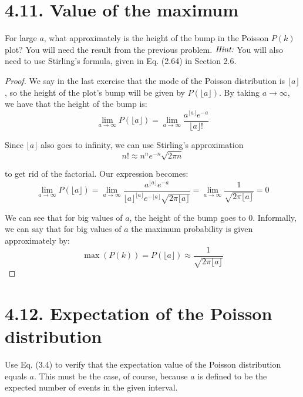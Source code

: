 \section*{4.11. Value of the maximum}
For large $a$, what approximately is the height of the bump in the Poisson $P(k)$ 
plot? You will need the result from the previous problem. $\emph{Hint:}$ You
will also need to use Stirling's formula, given in Eq. (2.64) in Section 2.6.

\vspace{1em}

\begin{proof}
    We say in the last exercise that the mode of the Poisson distribution is 
    $\lfloor a \rfloor$, so the height of the plot's bump will be given by $P(\lfloor a \rfloor)$.
    By taking $a \to \infty$, we have that the height of the bump is:
    \[
        \lim_{a \to \infty} P(\lfloor a \rfloor)
        = \lim_{a \to \infty} \frac{a^{\lfloor a \rfloor} e^{-a}}{\lfloor a \rfloor!}
    \] 

    Since $\lfloor a \rfloor$ also goes to infinity, we can use Stirling's approximation 
    \begin{equation*}\tag{2.64}
        n! \approx n^n e^{-n} \sqrt{2\pi n}
    \end{equation*}

    to get rid of the factorial. Our expression becomes:
    \[
        \lim_{a \to \infty} P(\lfloor a \rfloor)
        = \lim_{a \to \infty} \frac{a^{\lfloor a \rfloor} e^{-a}}{
            {\lfloor a \rfloor}^{\lfloor a \rfloor} e^{-\lfloor a \rfloor} \sqrt{2\pi{\lfloor a \rfloor}}}
            = \lim_{a \to \infty} \frac{1}{\sqrt{2\pi \lfloor a \rfloor}} = 0
    \] 

    We can see that for big values of $a$, the height of the
    bump goes to 0. Informally, we can say 
    that for big values of $a$ the maximum probability
    is given approximately by:
    \[
        \max(P(k)) = P(\lfloor a \rfloor) \approx \frac{1}{\sqrt{2\pi\lfloor a \rfloor}}
    \] 
\end{proof}

\section*{4.12. Expectation of the Poisson distribution}
Use Eq. (3.4) to verify that the expectation value of the Poisson distribution
equals $a$. This must be the case, of course, because $a$ is defined to be
the expected number of events in the given interval.

